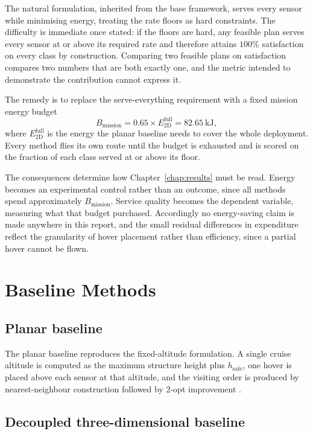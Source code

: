 The natural formulation, inherited from the base framework, serves every sensor while minimising energy, treating the rate floors as hard constraints. The difficulty is immediate once stated: if the floors are hard, any feasible plan serves every sensor at or above its required rate and therefore attains $100\%$ satisfaction on every class by construction. Comparing two feasible plans on satisfaction compares two numbers that are both exactly one, and the metric intended to demonstrate the contribution cannot express it.

The remedy is to replace the serve-everything requirement with a fixed mission energy budget
\begin{equation}
B_{\mathrm{mission}} = 0.65 \times E^{\mathrm{full}}_{\mathrm{2D}} = 82.65~\text{kJ},
\end{equation}
where $E^{\mathrm{full}}_{\mathrm{2D}}$ is the energy the planar baseline needs to cover the whole deployment. Every method flies its own route until the budget is exhausted and is scored on the fraction of each class served at or above its floor.

The consequences determine how Chapter~\ref{chap:results} must be read. Energy becomes an experimental control rather than an outcome, since all methods spend approximately $B_{\mathrm{mission}}$. Service quality becomes the dependent variable, measuring what that budget purchased. Accordingly no energy-saving claim is made anywhere in this report, and the small residual differences in expenditure reflect the granularity of hover placement rather than efficiency, since a partial hover cannot be flown.

\section{Baseline Methods}

\subsection{Planar baseline}

The planar baseline reproduces the fixed-altitude formulation. A single cruise altitude is computed as the maximum structure height plus $h_{\mathrm{safe}}$, one hover is placed above each sensor at that altitude, and the visiting order is produced by nearest-neighbour construction followed by 2-opt improvement \cite{croes1958method}.

\subsection{Decoupled three-dimensional baseline}
\label{sec:method_twostage}

